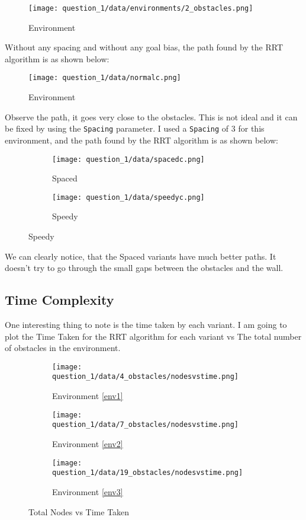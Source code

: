 \documentclass[12pt]{report}
\begin{document}
\begin{figure}[H]
    \centering
    \texttt{[image: question\_1/data/environments/2\_obstacles.png]}
    \caption{Environment}
\end{figure}

Without any spacing and without any goal bias, the path found by the RRT algorithm is as shown below:

\begin{figure}[H]
    \centering
    \texttt{[image: question\_1/data/normalc.png]}
    \caption{Environment}
\end{figure}

Observe the path, it goes very close to the obstacles. This is not ideal and it can be fixed by using the \texttt{Spacing} parameter. I used a \texttt{Spacing} of $3$ for this environment, and the path found by the RRT algorithm is as shown below:

\begin{figure}[H]
    \centering
    \begin{subfigure}{0.4\textwidth}
        \texttt{[image: question\_1/data/spacedc.png]}
        \caption{Spaced}
    \end{subfigure}
    \begin{subfigure}{0.4\textwidth}
        \texttt{[image: question\_1/data/speedyc.png]}
        \caption{Speedy}
    \end{subfigure}
\end{figure}

We can clearly notice, that the Spaced variants have much better paths. It doesn't try to go through the small gaps between the obstacles and the wall.

\subsection{Time Complexity}

One interesting thing to note is the time taken by each variant. I am going to plot the Time Taken for the RRT algorithm for each variant vs The total number of obstacles in the environment.

\begin{figure}[H]
    \centering
    \begin{subfigure}{0.32\textwidth}
        \texttt{[image: question\_1/data/4\_obstacles/nodesvstime.png]}
        \caption{Environment \ref{env1}}
    \end{subfigure}
    \begin{subfigure}{0.32\textwidth}
        \texttt{[image: question\_1/data/7\_obstacles/nodesvstime.png]}
        \caption{Environment \ref{env2}}
    \end{subfigure}
    \begin{subfigure}{0.32\textwidth}
        \texttt{[image: question\_1/data/19\_obstacles/nodesvstime.png]}
        \caption{Environment \ref{env3}}
    \end{subfigure}
    \caption{Total Nodes vs Time Taken}
\end{figure}
\end{document}
